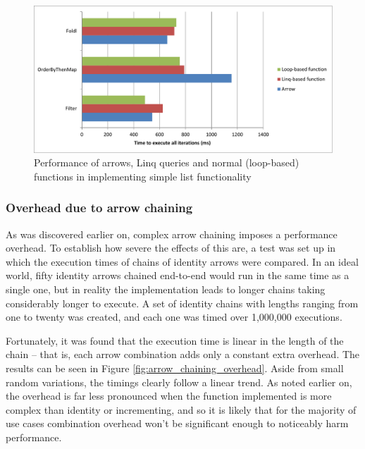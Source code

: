 \documentclass[12pt,twoside,notitlepage]{report}
\begin{document}
\begin{figure}[!ht]
  \centering
  \includegraphics[width=\textwidth]{fig/ListFunctionPerformanceChart.pdf}
  \caption{Performance of arrows, Linq queries and normal (loop-based) functions in implementing simple list functionality}
  \label{fig:list_function_performance}
\end{figure}

\subsubsection{Overhead due to arrow chaining}
\label{sec:arrow_chaining_overhead}

As was discovered earlier on, complex arrow chaining imposes a performance overhead. To establish how severe the effects of this are, a test was set up in which the execution times of chains of identity arrows were compared. In an ideal world, fifty identity arrows chained end-to-end would run in the same time as a single one, but in reality the implementation leads to longer chains taking considerably longer to execute. A set of identity chains with lengths ranging from one to twenty was created, and each one was timed over 1,000,000 executions.

Fortunately, it was found that the execution time is linear in the length of the chain -- that is, each arrow combination adds only a constant extra overhead. The results can be seen in Figure \ref{fig:arrow_chaining_overhead}. Aside from small random variations, the timings clearly follow a linear trend. As noted earlier on, the overhead is far less pronounced when the function implemented is more complex than identity or incrementing, and so it is likely that for the majority of use cases combination overhead won't be significant enough to noticeably harm performance.
\end{document}
